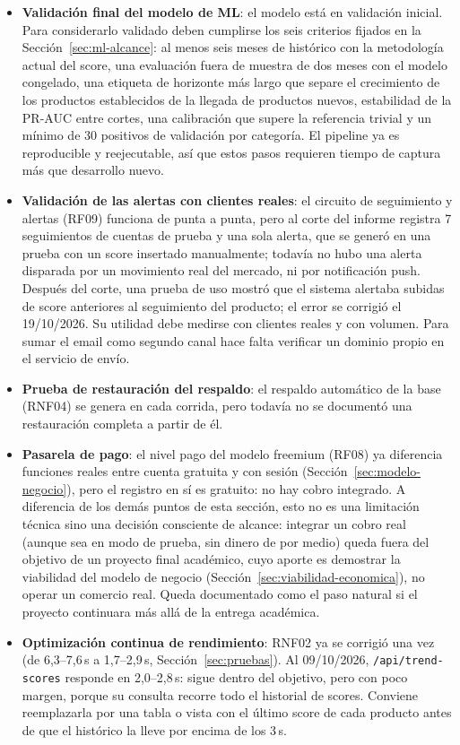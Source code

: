 \begin{itemize}
	\item \textbf{Validación final del modelo de ML}: el modelo está en validación inicial. Para considerarlo validado deben cumplirse los seis criterios fijados en la Sección~\ref{sec:ml-alcance}: al menos seis meses de histórico con la metodología actual del score, una evaluación fuera de muestra de dos meses con el modelo congelado, una etiqueta de horizonte más largo que separe el crecimiento de los productos establecidos de la llegada de productos nuevos, estabilidad de la PR-AUC entre cortes, una calibración que supere la referencia trivial y un mínimo de 30 positivos de validación por categoría. El pipeline ya es reproducible y reejecutable, así que estos pasos requieren tiempo de captura más que desarrollo nuevo.
	\item \textbf{Validación de las alertas con clientes reales}: el circuito de seguimiento y alertas (RF09) funciona de punta a punta, pero al corte del informe registra 7 seguimientos de cuentas de prueba y una sola alerta, que se generó en una prueba con un score insertado manualmente; todavía no hubo una alerta disparada por un movimiento real del mercado, ni por notificación push. Después del corte, una prueba de uso mostró que el sistema alertaba subidas de score anteriores al seguimiento del producto; el error se corrigió el 19/10/2026. Su utilidad debe medirse con clientes reales y con volumen. Para sumar el email como segundo canal hace falta verificar un dominio propio en el servicio de envío.
	\item \textbf{Prueba de restauración del respaldo}: el respaldo automático de la base (RNF04) se genera en cada corrida, pero todavía no se documentó una restauración completa a partir de él.
	\item \textbf{Pasarela de pago}: el nivel pago del modelo freemium (RF08) ya diferencia funciones reales entre cuenta gratuita y con sesión (Sección~\ref{sec:modelo-negocio}), pero el registro en sí es gratuito: no hay cobro integrado. A diferencia de los demás puntos de esta sección, esto no es una limitación técnica sino una decisión consciente de alcance: integrar un cobro real (aunque sea en modo de prueba, sin dinero de por medio) queda fuera del objetivo de un proyecto final académico, cuyo aporte es demostrar la viabilidad del modelo de negocio (Sección~\ref{sec:viabilidad-economica}), no operar un comercio real. Queda documentado como el paso natural si el proyecto continuara más allá de la entrega académica.
	\item \textbf{Optimización continua de rendimiento}: RNF02 ya se corrigió una vez (de 6,3--7,6\,s a 1,7--2,9\,s, Sección~\ref{sec:pruebas}). Al 09/10/2026, \texttt{/api/trend-scores} responde en 2,0--2,8\,s: sigue dentro del objetivo, pero con poco margen, porque su consulta recorre todo el historial de scores. Conviene reemplazarla por una tabla o vista con el último score de cada producto antes de que el histórico la lleve por encima de los 3\,s.

\end{itemize}
